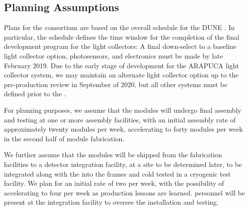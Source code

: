 \subsection{Planning Assumptions}
\label{sec:fdsp-pd-org-assmp}

Plans for the  consortium are based on the overall schedule for the DUNE . In particular, the  schedule defines the time window for the completion of the final development program for the light collectors: A final down-select to a baseline light collector option, photosensors, and  electronics must be made by late February 2019.  Due to the early stage of development for the ARAPUCA light collector system, we may maintain an alternate light collector option up to the pre-production review in September of 2020, but all other systems must be defined prior to the .

For planning purposes, we assume that the  modules will undergo final assembly and testing at one or more  assembly facilities, with an initial  assembly rate of approximately twenty modules per week, accelerating to forty modules per week in the second half of module fabrication.

We further assume that the modules will be shipped from the fabrication facilities to a detector integration facility,  
at a site to be determined later, to be integrated along with the  into the  frames and cold tested in a cryogenic test facility.  We plan for an initial rate of two  per week, with the possibility of accelerating to four  per week as production lessons are learned.   personnel will be present at the integration facility to oversee the installation and testing.

